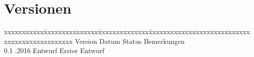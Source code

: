 
\color{black}
\chapter*{Versionen}
\vspace{10mm}

\fontsize{10pt}{18pt}\selectfont
\begin{tabbing}
xxxxxxxxxxx\=xxxxxxxxxxxxxxx\=xxxxxxxxxxxxxx\=xxxxxxxxxxxxxxxxxxxxxxxxxxxxxxxxxxxxxxxxxxxxxxx \kill
Version	\> Datum	\> Status		\> Bemerkungen		\\
0.1	.2016	\> Entwurf		\> Erster Entwurf	\\	
	
\end{tabbing}


